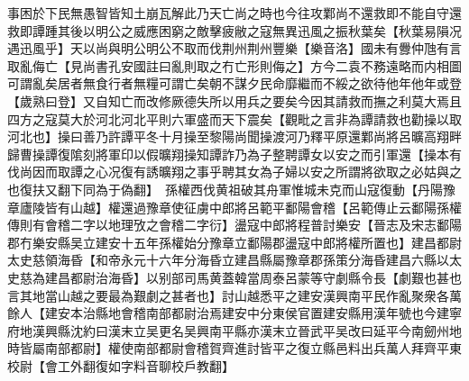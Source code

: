 事困於下民無愚智皆知土崩瓦解此乃天亡尚之時也今往攻鄴尚不還救即不能自守還救即譚踵其後以明公之威應困窮之敵擊疲敝之寇無異迅風之振秋葉矣【秋葉易隕况遇迅風乎】天以尚與明公明公不取而伐荆州荆州豐樂【樂音洛】國未有釁仲虺有言取亂侮亡【見尚書孔安國註曰亂則取之冇亡形則侮之】方今二袁不務遠略而内相圖可謂亂矣居者無食行者無糧可謂亡矣朝不謀夕民命靡繼而不綏之欲待他年他年或登【歲熟曰登】又自知亡而改修厥德失所以用兵之要矣今因其請救而撫之利莫大焉且四方之寇莫大於河北河北平則六軍盛而天下震矣【觀毗之言非為譚請救也勸操以取河北也】操曰善乃許譚平冬十月操至黎陽尚聞操渡河乃釋平原還鄴尚將呂曠高翔畔歸曹操譚復隂刻將軍印以假曠翔操知譚詐乃為子整聘譚女以安之而引軍還【操本有伐尚因而取譚之心况復有誘曠翔之事乎聘其女為子婦以安之所謂將欲取之必姑與之也復扶又翻下同為于偽翻】　孫權西伐黄祖破其舟軍惟城未克而山寇復動【丹陽豫章廬陵皆有山越】權還過豫章使征虜中郎將呂範平鄱陽會稽【呂範傳止云鄱陽孫權傳則有會稽二字以地理攷之會稽二字衍】盪寇中郎將程普討樂安【晉志及宋志鄱陽郡冇樂安縣吴立建安十五年孫權始分豫章立鄱陽郡盪寇中郎將權所置也】建昌都尉太史慈領海昏【和帝永元十六年分海昏立建昌縣屬豫章郡孫策分海昏建昌六縣以太史慈為建昌都尉治海昏】以别部司馬黄蓋韓當周泰呂蒙等守劇縣令長【劇艱也甚也言其地當山越之要最為艱劇之甚者也】討山越悉平之建安漢興南平民作亂聚衆各萬餘人【建安本治縣地會稽南部都尉治焉建安中分東侯官置建安縣用漢年號也今建寧府地漢興縣沈約曰漢末立吴更名吴興南平縣亦漢末立晉武平吴改曰延平今南劒州地時皆屬南部都尉】權使南部都尉會稽賀齊進討皆平之復立縣邑料出兵萬人拜齊平東校尉【會工外翻復如字料音聊校戶教翻】

